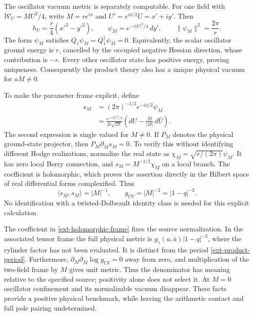 The oscillator vacuum metric is separately computable.  For one
field with $\mathcal W_U=MU^2/4$, write $M=r e^{i\phi}$ and
$U'=e^{i\phi/2}U=x'+iy'$.  Then
\begin{equation}
 h_U=\frac r4(x'^2-y'^2),\qquad
 \psi_M=e^{-r|U|^2/4}\,dy',\qquad
 \|\psi_M\|^2=\frac{2\pi}{r}.
 \label{ext-oscillator-vacuum}
\end{equation}
The form $\psi_M$ satisfies $Q_1\psi_M=Q_1^\dagger\psi_M=0$.
Equivalently, the scalar oscillator ground energy is $r$, cancelled
by the occupied negative Hessian direction, whose contribution is
$-r$.  Every other oscillator state has positive energy, proving
uniqueness.  Consequently the product theory also has a unique
physical vacuum for $aM\ne0$.

To make the parameter frame explicit, define
\begin{equation}
 \begin{split}
 s_M&=(2\pi)^{-1/2}e^{-i\phi/2}\psi_M\\
 &=\frac{e^{-r|U|^2/4}}{2i\sqrt{2\pi}}
       \left(dU-\frac{\bar M}{|M|}\,d\bar U\right).
 \end{split}
 \label{ext-holomorphic-frame}
\end{equation}
The second expression is single valued for $M\ne0$.  If $P_M$
denotes the physical ground-state projector, then
$P_M\partial_{\bar M}s_M=0$.  To verify this without identifying
different Hodge realizations, normalize the real state as
$\chi_M=\sqrt{r/(2\pi)}\psi_M$.  It has zero local Berry connection,
and $s_M=M^{-1/2}\chi_M$ on a local branch.  The coefficient is
holomorphic, which proves the assertion directly in the Hilbert
space of real differential forms complexified.  Thus
\begin{equation}
 \langle s_M,s_M\rangle=|M|^{-1},\qquad
 g_{UV}=|M|^{-2}=|1-q|^{-2}.
 \label{ext-physical-euler-metric}
\end{equation}
No identification with a twisted-Dolbeault identity class is needed
for this explicit calculation.

The coefficient in \eqref{ext-holomorphic-frame} fixes the source
normalization.  In the associated tensor frame the full physical
metric is $g_\gamma(a,\bar a)|1-q|^{-2}$, where the cylinder factor
has not been evaluated.  It is distinct from the period
\eqref{ext-product-period}.  Furthermore,
$\partial_M\partial_{\bar M}\log g_{UV}=0$ away from zero, and
multiplication of the two-field frame by $M$ gives unit metric.
Thus the denominator has meaning relative to the specified source;
positivity alone does not select it.  At $M=0$ oscillator confinement
and its normalizable vacuum disappear.  These facts provide a
positive physical benchmark, while leaving the arithmetic contact
and full pole pairing undetermined.

